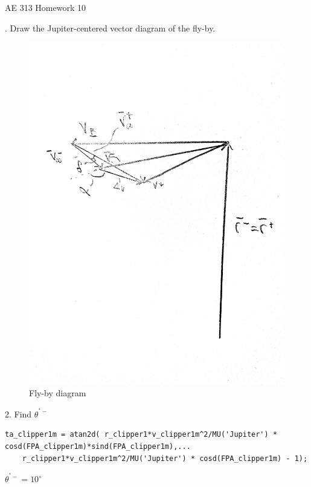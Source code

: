 \documentclass[hidelinks,12pt]{article}
\begin{document}

\begin{center}
\large AE 313 Homework 10
\end{center}
. Draw the Jupiter-centered vector diagram of the fly-by.\\
\begin{figure}[!htb]
  \center
  \includegraphics[scale=0.1]{1}
  \caption{Fly-by diagram}
  \label{fig:Fig01}
\end{figure}
\vspace{10px}
2. Find $\theta^{^*-}$\\
\begin{lstlisting}[frame=lines,style=Matlab-editor,basicstyle = \mlttfamily]
ta_clipper1m = atan2d( r_clipper1*v_clipper1m^2/MU('Jupiter') * cosd(FPA_clipper1m)*sind(FPA_clipper1m),...
    r_clipper1*v_clipper1m^2/MU('Jupiter') * cosd(FPA_clipper1m) - 1);
\end{lstlisting}
$\theta^{^*-}=10^\circ$\\
\end{document}
